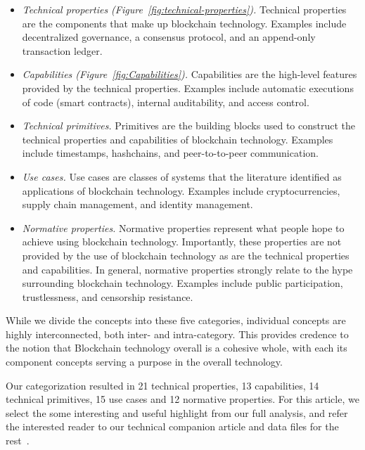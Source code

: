 \begin{itemize}

\item \emph{Technical properties (Figure~\ref{fig:technical-properties}).} Technical properties are the components that make up blockchain technology. Examples include decentralized governance, a consensus protocol, and an append-only transaction ledger.
	
\item \emph{Capabilities (Figure~\ref{fig:Capabilities}).} Capabilities are the high-level features provided by the technical properties. Examples include automatic executions of code (\ie smart contracts), internal auditability, and access control.
	
\item \emph{Technical primitives.} Primitives are the building blocks used to construct the technical properties and capabilities of blockchain technology. Examples include timestamps, hashchains, and peer-to-to-peer communication.
	
\item \emph{Use cases.} Use cases are classes of systems that the literature identified as applications of blockchain technology. Examples include cryptocurrencies, supply chain management, and identity management.
	
\item \emph{Normative properties.} Normative properties represent what people hope to achieve using blockchain technology. Importantly, these properties are not provided by the use of blockchain technology as are the technical properties and capabilities. In general, normative properties strongly relate to the hype surrounding blockchain technology. Examples include public participation, trustlessness, and censorship resistance.

\end{itemize}

While we divide the concepts into these five categories, individual concepts are highly interconnected, both inter- and intra-category. This provides credence to the notion that Blockchain technology overall is a cohesive whole, with each its component concepts serving a purpose in the overall technology.

Our categorization resulted in 21 technical properties, 13 capabilities, 14 technical primitives, 15 use cases and 12 normative properties. For this article, we select the some interesting and useful highlight from our full analysis, and refer the interested reader to our technical companion article and data files for the rest~\cite{RKYCC19}.

